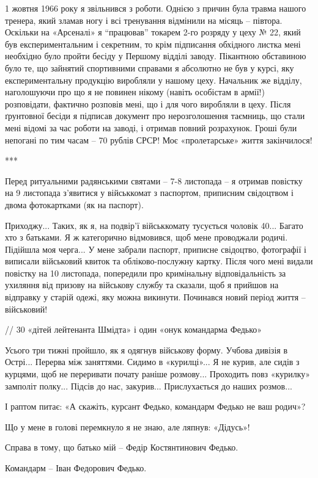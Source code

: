 1 жовтня 1966 року я звільнився з роботи. Однією з причин була травма нашого
тренера, який зламав ногу і всі тренування відмінили на місяць – півтора.
Оскільки на «Арсеналі» я \enquote{працював} токарем 2-го розряду у цеху № 22, який був
експериментальним і секретним, то крім підписання обхідного листка мені
необхідно було пройти бесіду у Першому відділі заводу. Пікантною обставиною
було те, що зайнятий спортивними справами я абсолютно не був у курсі, яку
експериментальну продукцію виробляли у нашому цеху. Начальник же відділу,
наголошуючи про що я не повинен нікому (навіть особістам в армії!) розповідати,
фактично розповів мені, що і для чого виробляли в цеху. Після ґрунтовної бесіди
я підписав документ про нерозголошення таємниць, що стали мені відомі за час
роботи на заводі, і отримав повний розрахунок. Гроші були непогані по тим часам
– 70 рублів СРСР! Моє «пролетарське» життя закінчилося! 

***

Перед ритуальними радянськими святами – 7-8 листопада – я отримав повістку на 9
листопада з’явитися у військкомат з паспортом, приписним свідоцтвом і двома
фотокартками (як на паспорт). 

Приходжу... Таких, як я, на подвір’ї військкомату тусується чоловік 40... Багато
хто з батьками. Я ж категорично відмовився, щоб мене проводжали родичі.
Підійшла моя черга... У мене забрали паспорт, приписне свідоцтво, фотографії і
виписали військовий квиток та обліково-послужну картку. Після чого мені видали
повістку на 10 листопада, попередили про кримінальну відповідальність за
ухиляння від призову на військову службу та сказали, щоб я прийшов на відправку
у старій одежі, яку можна викинути. Починався новий період життя – військовий!

// 30 «дітей лейтенанта Шмідта» і один «онук командарма Федько»

Усього три тижні пройшло, як я одягнув військову форму. Учбова дивізія в Острі...
Перерва між заняттями. Сидимо в «курилці»... Я не курив, але сидів з курцями, щоб
не переривати почату раніше розмову... Проходить повз «курилку» замполіт полку...
Підсів до нас, закурив... Прислухається до наших розмов... 

І раптом питає: «А скажіть, курсант Федько, командарм Федько не ваш родич»? 

Що у мене в голові перемкнуло я не знаю, але ляпнув: «Дідусь»! 

Справа в тому, що батько мій – Федір Костянтинович Федько. 

Командарм – Іван Федорович Федько.

